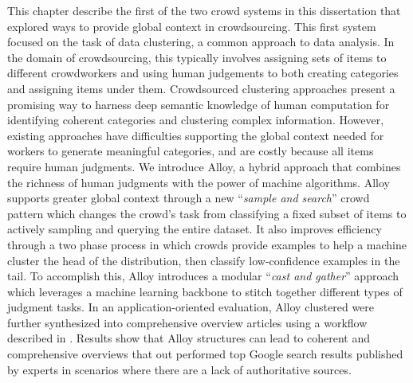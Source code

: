 This chapter describe the first of the two crowd systems in this dissertation that explored ways to provide global context in crowdsourcing. This first system focused on the task of data clustering, a common approach to data analysis. In the domain of crowdsourcing, this typically involves assigning sets of items to different crowdworkers and using human judgements to both creating categories and assigning items under them.
Crowdsourced clustering approaches present a promising way to harness deep semantic knowledge of human computation for identifying coherent categories and clustering complex information.
However, existing approaches have difficulties supporting the global context needed for workers to generate meaningful categories, and are costly because all items require human judgments. We introduce Alloy, a hybrid approach that combines the richness of human judgments with the power of machine algorithms. Alloy supports greater global context through a new ``\emph{sample and search}'' crowd pattern which changes the crowd's task from classifying a fixed subset of items to actively sampling and querying the entire dataset.  It also improves efficiency through a two phase process in which crowds provide examples to help a machine cluster the head of the distribution, then classify low-confidence examples in the tail. To accomplish this, Alloy introduces a modular ``\emph{cast and gather}'' approach which leverages a machine learning backbone to stitch together different types of judgment tasks. In an application-oriented evaluation, Alloy clustered were further synthesized into comprehensive overview articles using a workflow described in \cite{ka}. Results show that Alloy structures can lead to coherent and comprehensive overviews that out performed top Google search results published by experts in scenarios where there are a lack of authoritative sources.

% 

